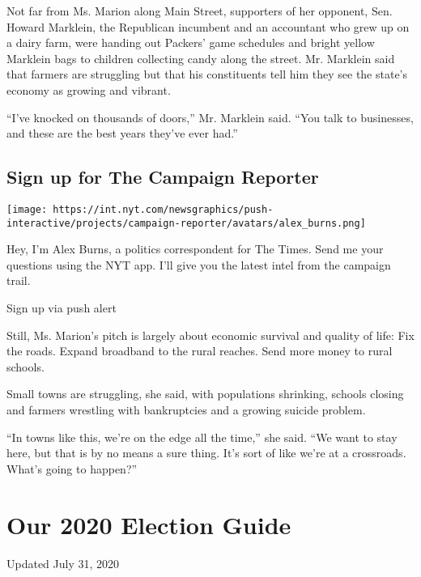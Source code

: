 Not far from Ms. Marion along Main Street, supporters of her opponent,
Sen. Howard Marklein, the Republican incumbent and an accountant who
grew up on a dairy farm, were handing out Packers' game schedules and
bright yellow Marklein bags to children collecting candy along the
street. Mr. Marklein said that farmers are struggling but that his
constituents tell him they see the state's economy as growing and
vibrant.

``I've knocked on thousands of doors,'' Mr. Marklein said. ``You talk to
businesses, and these are the best years they've ever had.''

\href{https://www.nytimes.com/interactive/2018/09/28/us/politics/the-campaign-reporter-ul.html?src=hpPromoHeadline}{}

\hypertarget{sign-up-for-the-campaign-reporter}{%
\subsection{Sign up for The Campaign
Reporter}\label{sign-up-for-the-campaign-reporter}}

\texttt{[image: https://int.nyt.com/newsgraphics/push-interactive/projects/campaign-reporter/avatars/alex\_burns.png]}

Hey, I'm Alex Burns, a politics correspondent for The Times. Send me
your questions using the NYT app. I'll give you the latest intel from
the campaign trail.

Sign up via push alert

Still, Ms. Marion's pitch is largely about economic survival and quality
of life: Fix the roads. Expand broadband to the rural reaches. Send more
money to rural schools.

Small towns are struggling, she said, with populations shrinking,
schools closing and farmers wrestling with bankruptcies and a growing
suicide problem.

``In towns like this, we're on the edge all the time,'' she said. ``We
want to stay here, but that is by no means a sure thing. It's sort of
like we're at a crossroads. What's going to happen?''

\hypertarget{our-2020-election-guide}{%
\section{Our 2020 Election Guide}\label{our-2020-election-guide}}

Updated July 31, 2020


